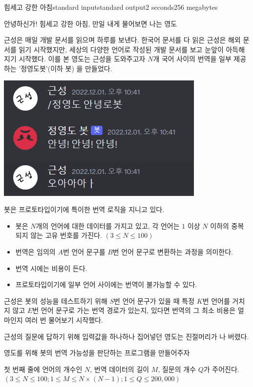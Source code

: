 \begin{problem}{힘세고 강한 아침}{standard input}{standard output}{2 seconds}{256 megabytes}

안녕하신가! 힘세고 강한 아침, 만일 내게 물어보면 
나는 영도

근성은 매일 개발 문서를 읽으며 하루를 보낸다.
한국어 문서를 다 읽은 근성은 해외 문서를 읽기 시작했지만, 세상의 다양한 언어로 작성된 개발 문서를 보고 눈앞이 아득해지기 시작했다.
이를 본 영도는 근성을 도와주고자 $N$개 국어 사이의 번역을 일부 제공하는 '정영도봇'(이하 봇) 을 만들었다.

\begin{center}
\includegraphics[scale=1]{1.png}
\end{center}

봇은 프로토타입이기에 특이한 번역 로직을 지니고 있다.

\begin{itemize}
 \item 봇은 $N$개의 언어에 대한 데이터를 가지고 있고, 각 언어는 $1$ 이상 $N$ 이하의 중복되지 않는 고유 번호를 가진다. $( 3 \le N \le 100 )$
 \item 번역은 임의의 $A$번 언어 문구를 $B$번 언어 문구로 변환하는 과정을 의미한다.
 \item 번역 시에는 비용이 든다.
 \item 프로토타입이기에 일부 언어 사이에는 번역이 불가능할 수 있다.
 

\end{itemize}
근성은 봇의 성능을 테스트하기 위해 $S$번 언어 문구가 있을 때 특정 $K$번 언어를 거치지 않고 $E$번 언어 문구로 가는 번역 경로가 있는지, 있다면 번역의 그 최소 비용은 얼마인지 여러 번 물어보기 시작했다.

근성의 질문에 답하기 위해 입력값을 하나하나 집어넣던 영도는 진절머리가 나 버렸다.

영도를 위해 봇의 번역 가능성을 판단하는 프로그램을 만들어주자

\InputFile
첫 번째 줄에 언어의 개수인 $N$, 번역 데이터의 길이 $M$, 질문의 개수 $Q$가 주어진다. $( 3 \le N \le 100; 1 \le M \le N \times (N-1); 1 \le Q \le 200,000 )$


\end{problem}
